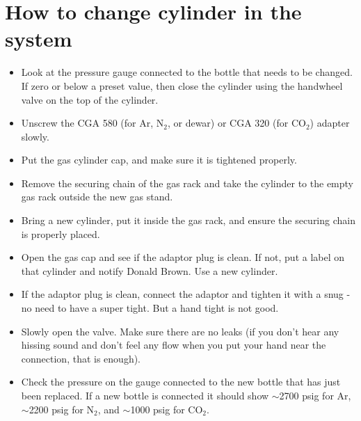 \section{How to change cylinder in the system}
\begin{itemize}
\item
 Look at the pressure gauge connected to the bottle that needs to be changed. If zero or below a preset value, then
 close the cylinder using the handwheel valve on the top of the cylinder.
\item Unscrew the CGA 580 (for Ar, N$_2$, or dewar) or CGA 320 (for CO$_2$) adapter slowly.
\item Put the gas cylinder cap, and make sure it is tightened properly.
\item Remove the securing chain of the gas rack and take the cylinder to the empty gas rack outside the new gas stand.
\item Bring a new cylinder, put it inside the gas rack, and ensure the securing chain is properly placed.
\item Open the gas cap and see if the adaptor plug is clean. If not, put a label on that cylinder and notify Donald Brown. Use a new cylinder.
\item If the adaptor plug is clean, connect the adaptor and tighten it with a snug - no need to have a super tight. But a hand tight is not good.
\item Slowly open the valve. Make sure there are no leaks (if you don't hear any hissing sound and don't feel any flow when you put your hand near the connection, that is enough).
\item Check the pressure on the gauge connected to the new bottle that has just been replaced. If a new bottle is connected it should show $\sim$2700 psig for Ar, $\sim$2200 psig for N$_2$, and $\sim$1000 psig for CO$_2$.
\end{itemize}


